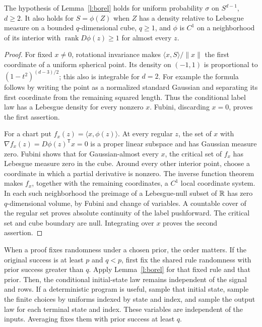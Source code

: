 \begin{lemma}\label{l:prior-ac}
The hypothesis of Lemma~\ref{l:borel} holds for uniform probability
\(\sigma\) on \(S^{d-1}\), \(d\ge2\). It also holds for
\(S=\phi(Z)\) when \(Z\) has a density relative to Lebesgue measure
on a bounded \(q\)-dimensional cube, \(q\ge1\), and \(\phi\) is
\(C^1\) on a neighborhood of its interior with
\(\operatorname{rank}D\phi(z)\ge1\) for almost every \(z\).
\end{lemma}

\begin{proof}
For fixed \(x\ne0\), rotational invariance makes
\(\langle x,S\rangle/\|x\|\) the first coordinate of a uniform
spherical point. Its density on \((-1,1)\) is proportional to
\((1-t^2)^{(d-3)/2}\); this also is integrable for \(d=2\).
For example the formula follows by writing the point as a normalized
standard Gaussian and separating its first coordinate from the
remaining squared length. Thus the conditional label law has a
Lebesgue density for every nonzero \(x\). Fubini, discarding \(x=0\),
proves the first assertion.

For a chart put \(f_x(z)=\langle x,\phi(z)\rangle\). At every
regular \(z\), the set of \(x\) with
\(\nabla f_x(z)=D\phi(z)^{\mathsf T}x=0\) is a proper linear
subspace and has Gaussian measure zero. Fubini shows that for
Gaussian-almost every \(x\), the critical set of \(f_x\) has
Lebesgue measure zero in the cube. Around every other interior point,
choose a coordinate in which a partial derivative is nonzero. The
inverse function theorem makes \(f_x\), together with the remaining
coordinates, a \(C^1\) local coordinate system. In each such
neighborhood the preimage of a Lebesgue-null subset of \(\mathbb R\) has
zero \(q\)-dimensional volume, by Fubini and change of variables.
A countable cover of the regular set proves absolute continuity of
the label pushforward. The critical set and cube boundary are null.
Integrating over \(x\) proves the second assertion.
\end{proof}

When a proof fixes randomness under a chosen prior, the order matters.
If the original success is at least \(p\) and \(q<p\), first fix the
shared rule randomness with prior success greater than \(q\).
Apply Lemma~\ref{l:borel} for that fixed rule and that prior. Then,
the conditional initial-state law remains independent of the signal
and rows. If a deterministic program is useful, sample that initial
state, sample the finite choices by uniforms indexed by state and
index, and sample the output law for each terminal state and index.
These variables are independent of the inputs. Averaging fixes them
with prior success at least \(q\).

